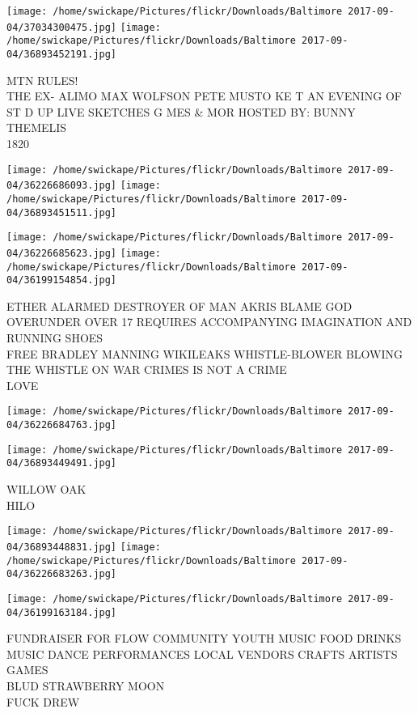 \documentclass[10pt,letterpaper]{article}
\begin{document}
\vspace{0.25in}
\texttt{[image: /home/swickape/Pictures/flickr/Downloads/Baltimore 2017-09-04/37034300475.jpg]}
\texttt{[image: /home/swickape/Pictures/flickr/Downloads/Baltimore 2017-09-04/36893452191.jpg]}

MTN RULES!\\
THE EX{-} ALIMO MAX WOLFSON PETE MUSTO KE T AN EVENING OF ST D UP LIVE SKETCHES G MES \& MOR HOSTED BY: BUNNY THEMELIS\\
1820\\
\pagebreak

\texttt{[image: /home/swickape/Pictures/flickr/Downloads/Baltimore 2017-09-04/36226686093.jpg]}
\texttt{[image: /home/swickape/Pictures/flickr/Downloads/Baltimore 2017-09-04/36893451511.jpg]}

\texttt{[image: /home/swickape/Pictures/flickr/Downloads/Baltimore 2017-09-04/36226685623.jpg]}
\texttt{[image: /home/swickape/Pictures/flickr/Downloads/Baltimore 2017-09-04/36199154854.jpg]}

ETHER ALARMED DESTROYER OF MAN AKRIS BLAME GOD\\
OVERUNDER OVER 17 REQUIRES ACCOMPANYING IMAGINATION AND RUNNING SHOES\\
FREE BRADLEY MANNING WIKILEAKS WHISTLE{-}BLOWER BLOWING THE WHISTLE ON WAR CRIMES IS NOT A CRIME\\
LOVE\\
\pagebreak

\texttt{[image: /home/swickape/Pictures/flickr/Downloads/Baltimore 2017-09-04/36226684763.jpg]}

\vspace{0.25in}
\texttt{[image: /home/swickape/Pictures/flickr/Downloads/Baltimore 2017-09-04/36893449491.jpg]}

WILLOW OAK\\
HILO\\
\pagebreak

\texttt{[image: /home/swickape/Pictures/flickr/Downloads/Baltimore 2017-09-04/36893448831.jpg]}
\texttt{[image: /home/swickape/Pictures/flickr/Downloads/Baltimore 2017-09-04/36226683263.jpg]}

\vspace{0.25in}
\texttt{[image: /home/swickape/Pictures/flickr/Downloads/Baltimore 2017-09-04/36199163184.jpg]}

FUNDRAISER FOR FLOW COMMUNITY YOUTH MUSIC FOOD DRINKS MUSIC DANCE PERFORMANCES LOCAL VENDORS CRAFTS ARTISTS GAMES\\
BLUD STRAWBERRY MOON\\
FUCK DREW\\
\pagebreak
\end{document}
